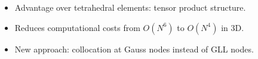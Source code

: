 \documentclass[compress]{beamer}
\theoremstyle{plain}
\newcommand{\LRp}[1]{\left( #1 \right)}
\renewcommand{\note}[1]{\textcolor{red}{{#1}}}
\begin{document}
{%
\begin{itemize}
\item Advantage over tetrahedral elements: tensor product structure.
\vspace{.5em}
\item Reduces computational costs from $O(N^6)$ to $O(N^4)$ in 3D.
\vspace{.5em}
\item New approach: collocation at Gauss nodes instead of GLL nodes.
\end{itemize} 
}
\end{document}
